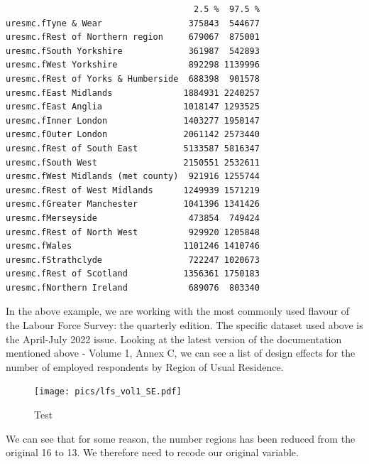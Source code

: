 \documentclass[
  14,
  a4paper,
  DIV=11,
  numbers=noendperiod]{scrartcl}
\begin{document}
\begin{verbatim}
                                     2.5 %  97.5 %
uresmc.fTyne & Wear                 375843  544677
uresmc.fRest of Northern region     679067  875001
uresmc.fSouth Yorkshire             361987  542893
uresmc.fWest Yorkshire              892298 1139996
uresmc.fRest of Yorks & Humberside  688398  901578
uresmc.fEast Midlands              1884931 2240257
uresmc.fEast Anglia                1018147 1293525
uresmc.fInner London               1403277 1950147
uresmc.fOuter London               2061142 2573440
uresmc.fRest of South East         5133587 5816347
uresmc.fSouth West                 2150551 2532611
uresmc.fWest Midlands (met county)  921916 1255744
uresmc.fRest of West Midlands      1249939 1571219
uresmc.fGreater Manchester         1041396 1341426
uresmc.fMerseyside                  473854  749424
uresmc.fRest of North West          929920 1205848
uresmc.fWales                      1101246 1410746
uresmc.fStrathclyde                 722247 1020673
uresmc.fRest of Scotland           1356361 1750183
uresmc.fNorthern Ireland            689076  803340
\end{verbatim}

In the above example, we are working with the most commonly used flavour
of the Labour Force Survey: the quarterly edition. The specific dataset
used above is the April-July 2022 issue. Looking at the latest version
of the documentation mentioned above - Volume 1, Annex C, we can see a
list of design effects for the number of employed respondents by Region
of Usual Residence.

\begin{figure}

{\centering \texttt{[image: pics/lfs\_vol1\_SE.pdf]}

}

\caption{Test}

\end{figure}

We can see that for some reason, the number regions has been reduced
from the original 16 to 13. We therefore need to recode our original
variable.
\end{document}
